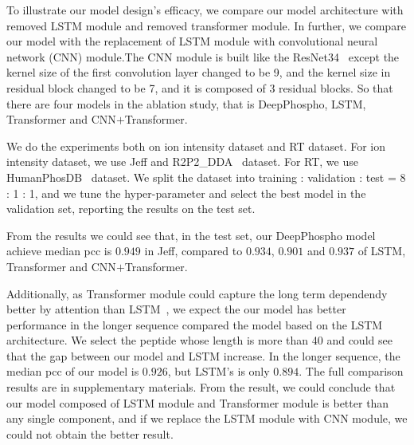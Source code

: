 To illustrate our model design's efficacy, we compare our model architecture with removed LSTM module and removed transformer module. In further, we compare our model with the replacement of LSTM module with convolutional neural network (CNN) module.The CNN module is built like the ResNet34~\cite{he2015deep} except the kernel size of the first convolution layer changed to be 9, and the kernel size in residual block changed to be 7, and it is composed of 3 residual blocks.
So that there are four models in the ablation study, that is DeepPhospho, LSTM, Transformer and CNN$+$Transformer. 

We do the experiments both on ion intensity dataset and RT dataset. For ion intensity dataset, we use Jeff and R2P2\_DDA~\cite{leutert2019r2} dataset. For RT, we use HumanPhosDB~\cite{lawrence2016plug} dataset. We split the dataset into training : validation : test = 8 : 1 : 1, and we tune the hyper-parameter and select the best model in the validation set, reporting the results on the test set.

From the results we could see that, in the test set, our DeepPhospho model achieve median pcc is $0.949$ in Jeff, compared to $0.934$, $0.901$ and $0.937$ of LSTM, Transformer and CNN$+$Transformer. 

Additionally, as Transformer module could capture the long term dependendy better by attention than LSTM~\cite{vaswani2017attention}, we expect the our model has better performance in the longer sequence compared the model based on the LSTM architecture. We select the peptide whose length is more than 40 and could see that the gap between our model and LSTM increase. In the longer sequence, the median pcc of our model is $0.926$, but LSTM's is only $0.894$.
The full comparison results are in supplementary materials. From the result, we could conclude that our model composed of LSTM module and Transformer module is better than any single component, and if we replace the LSTM module with CNN module, we could not obtain the better result.

